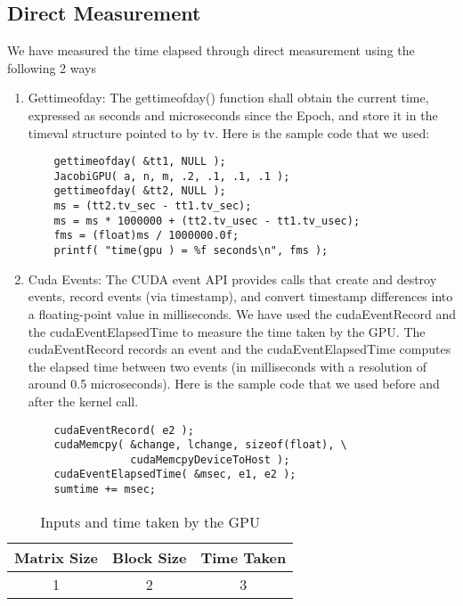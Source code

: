 \documentclass[10pt, twocolumn]{article}
\begin{document}
    \subsection{Direct Measurement} 
    We have measured the time elapsed through direct measurement using the following 2 ways
    \begin{enumerate}
    \item Gettimeofday: The gettimeofday() function shall obtain the current time, expressed as seconds and microseconds since the Epoch, and store it in the timeval structure pointed to by tv.
    Here is the sample code that we used:
    \begin{tiny}
    \begin{verbatim}
    gettimeofday( &tt1, NULL );
    JacobiGPU( a, n, m, .2, .1, .1, .1 );
    gettimeofday( &tt2, NULL );
    ms = (tt2.tv_sec - tt1.tv_sec);
    ms = ms * 1000000 + (tt2.tv_usec - tt1.tv_usec);
    fms = (float)ms / 1000000.0f;
    printf( "time(gpu ) = %f seconds\n", fms );
    \end{verbatim}
    \end{tiny}

    \item Cuda Events: The CUDA event API provides calls that create and destroy events, record events (via timestamp), and convert timestamp differences into a floating-point value in milliseconds.
    We have used the cudaEventRecord and the cudaEventElapsedTime to  measure the time taken by the GPU.
    The cudaEventRecord records an event and the cudaEventElapsedTime  computes the elapsed time between two events (in milliseconds with a resolution of around 0.5 microseconds).
    Here is the sample code that we used before and after the kernel call. 

    \begin{tiny}
    \begin{verbatim}
    cudaEventRecord( e2 );
    cudaMemcpy( &change, lchange, sizeof(float), \ 
                cudaMemcpyDeviceToHost );
    cudaEventElapsedTime( &msec, e1, e2 );
    sumtime += msec;
    \end{verbatim}
    \end{tiny}

    \end{enumerate}

    \begin{table}\footnotesize
    \centering
        \begin{tabular}{ | c | c | c | }
        \hline
        Matrix Size & Block Size & Time Taken \\
        \hline
        1 & 2 & 3 \\
        \hline
        \end{tabular}
        \caption{Inputs and time taken by the GPU}
        \label{tab:inputs_time_taken}
    \end{table}
\end{document}
